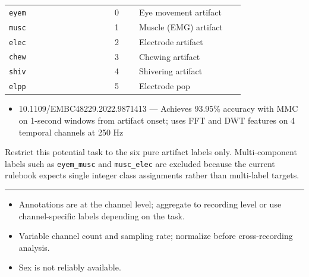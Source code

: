 {\begin{tcolorbox}
\begin{tabular}{@{}p{0.3911\linewidth}p{0.0978\linewidth}p{0.3911\linewidth}@{}}
\midrule
\texttt{eyem} & 0 & Eye movement artifact \\
\texttt{musc} & 1 & Muscle (EMG) artifact \\
\texttt{elec} & 2 & Electrode artifact \\
\texttt{chew} & 3 & Chewing artifact \\
\texttt{shiv} & 4 & Shivering artifact \\
\texttt{elpp} & 5 & Electrode pop \\
\bottomrule
\end{tabular}
\endgroup
\par{}\par
\begin{itemize}[leftmargin=1.3em,noitemsep,topsep=1pt]
\item[\scriptsize$\cdot$] {\scriptsize 10.1109/EMBC48229.2022.9871413 --- Achieves 93.95\% accuracy with MMC on 1-second windows from artifact onset; uses FFT and DWT features on 4 temporal channels at 250 Hz}
\end{itemize}
\par{} {\footnotesize Restrict this potential task to the six pure artifact labels only. Multi-component labels such as \texttt{eyem\_musc} and \texttt{musc\_elec} are excluded because the current rulebook expects single integer class assignments rather than multi-label targets.}
\par\smallskip
\noindent\rule{\linewidth}{0.4pt}\par\nopagebreak
{}\par\smallskip
\begin{itemize}[leftmargin=1.4em,noitemsep,topsep=2pt]
\item{\footnotesize Annotations are at the channel level; aggregate to recording level or use channel-specific labels depending on the task.}
\item{\footnotesize Variable channel count and sampling rate; normalize before cross-recording analysis.}
\item{\footnotesize Sex is not reliably available.}
\end{itemize}
\end{tcolorbox}
}